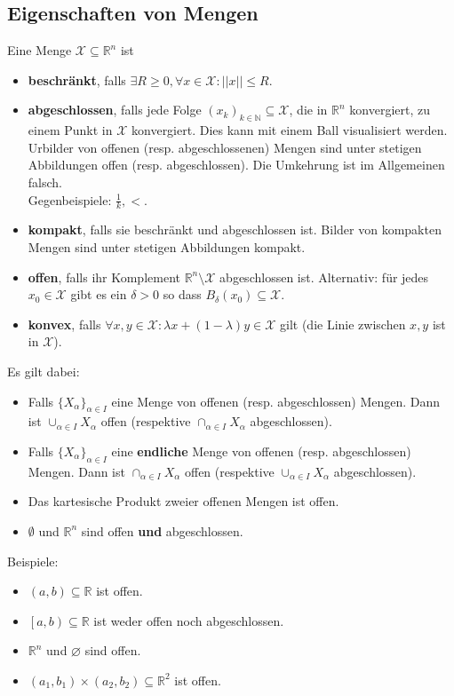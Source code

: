 \documentclass[a4paper,10pt]{article}
\def\R{\mathbb{R}}
\def\N{\mathbb{N}}
\def\X{\mathcal{X}}
\begin{document}
\subsection{Eigenschaften von Mengen}
Eine Menge \(\X \subseteq \R^n \) ist
\begin{itemize}
  \item \textbf{beschränkt}, falls \(\exists R \ge 0, \forall x \in \X: ||x|| \le R\).
  \item \textbf{abgeschlossen}, falls jede Folge \((x_k)_{k\in \N} \subseteq \X\), die in \(\R^n\) konvergiert, zu einem Punkt in \(\X\) konvergiert. Dies kann mit einem Ball visualisiert werden. \\Urbilder von offenen (resp. abgeschlossenen) Mengen sind unter stetigen Abbildungen offen (resp. abgeschlossen). Die Umkehrung ist im Allgemeinen falsch.\\
  Gegenbeispiele: \(\frac{1}{k}, <\).
  \item \textbf{kompakt}, falls sie beschränkt und abgeschlossen ist. Bilder von kompakten Mengen sind unter stetigen Abbildungen kompakt.
  \item \textbf{offen}, falls ihr Komplement \(\R^n \setminus \X\) abgeschlossen ist. Alternativ: für jedes $x_0 \in \X$ gibt es ein $\delta > 0$ so dass $B_\delta(x_0) \subseteq \X$.
  \item \textbf{konvex}, falls \(\forall x, y \in \X: \lambda x + (1 - \lambda)y \in \X\) gilt (die Linie zwischen \(x, y\) ist in \(\X\)).
\end{itemize}

Es gilt dabei:

\begin{itemize}
  \item Falls $\{X_\alpha\}_{\alpha \in I}$ eine Menge von offenen (resp. abgeschlossen) Mengen. Dann ist $\cup_{\alpha \in I} X_\alpha$ offen (respektive $\cap_{\alpha \in I} X_\alpha$ abgeschlossen).
  \item Falls $\{X_\alpha\}_{\alpha \in I}$ eine \textbf{endliche} Menge von offenen (resp. abgeschlossen) Mengen. Dann ist $\cap_{\alpha \in I} X_\alpha$ offen (respektive $\cup_{\alpha \in I} X_\alpha$ abgeschlossen).
  \item Das kartesische Produkt zweier offenen Mengen ist offen.
  \item $\emptyset$ und $\R^n$ sind offen \textbf{und} abgeschlossen.
\end{itemize}

Beispiele:
\begin{itemize}
  \item \((a,b) \subseteq \R\) ist offen.
  \item \(\left[a,b\right) \subseteq \R\) ist weder offen noch abgeschlossen.
  \item \(\R^n\) und \(\varnothing\) sind offen.
  \item \((a_1, b_1) \times (a_2,b_2) \subseteq \R^2\) ist offen.
\end{itemize}
\end{document}

